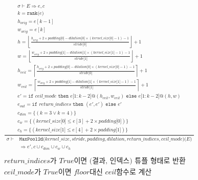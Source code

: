 \documentclass{article}
\makeatletter
\newcommand{\x}{\times}
\newcommand{\Rar}{\Rightarrow}
\newcommand{\mtt}[1]{\mathtt{#1}}
\newcommand{\op}[2]{\mtt{#1(}#2\mtt{)}}
\newcommand{\module}[3]{\mtt{#1(}#2\mtt{)(}#3\mtt{)}}
\newcommand{\conc}{\mtt{@}}
\newcommand{\ind}[1]{\mtt{[}#1\mtt{]}}
\newcommand{\indr}[2]{\mtt{[}#1\mtt{:}#2\mtt{]}}
\newcommand{\ifs}[3]{\mtt{if}\,\,#1\,\,\mtt{then}\,\,#2\,\,\mtt{else}\,\,#3}
\makeatother
\begin{document}
\begin{align*}
  \frac
  {
    \begin{array}{l}
      \sigma \vdash E \Rar e, c \\
      k = \op{rank}{e} \\
      h_{orig} = e[k-1] \\
      w_{orig} = e[k] \\
      h = \left\lfloor \frac{h_{orig} + 2 \x padding \ind{0} - dilation \ind{0}
        \x (kernel\_size \ind{0} - 1) - 1}{stride \ind{0}} \right\rfloor + 1 \\
      w = \left\lfloor \frac{w_{orig} + 2 \x padding \ind{1} - dilation \ind{1}
        \x (kernel\_size \ind{1} - 1) - 1}{stride \ind{1}} \right\rfloor + 1 \\
      h_{ceil} = \left\lceil \frac{h_{orig} + 2 \x padding \ind{0} - dilation \ind{0}
        \x (kernel\_size \ind{0} - 1) - 1}{stride \ind{0}} \right\rceil + 1 \\
      w_{ceil} = \left\lceil \frac{w_{orig} + 2 \x padding \ind{1} - dilation \ind{1}
        \x (kernel\_size \ind{1} - 1) - 1}{stride \ind{1}} \right\rceil + 1 \\
      e' = \ifs{ceil\_mode}{e\indr{1}{k-2} \conc (h_{ceil},
      w_{ceil})}{e\indr{1}{k-2} \conc (h, w)} \\
      e_{out} = \ifs{return\_indices}{(e', e')}{e'}\\
      c_{dim} = \{ (k = 3 \lor k = 4) \} \\
      c_w = \{ (kernel\_size\ind{0} \leq e[3] + 2 \x padding \ind{0}) \} \\
      c_h = \{ (kernel\_size\ind{1} \leq e[4] + 2 \x padding \ind{1}) \} 
    \end{array}
  }
  {
    \begin{array}{rl}
      \sigma \vdash & \module{MaxPool2d}{kernel\_size, stride, padding,
        dilation, return\_indices, ceil\_mode}{E} \\
      & \Rar e', c \cup c_{dim} \cup c_w \cup c_h 
    \end{array}
  } \\
  \\
  \text{$return\_indices$가 $True$이면 (결과, 인덱스) 튜플 형태로 반환}\\
  \text{$ceil\_mode$가 $True$이면 $floor$대신 $ceil$함수로 계산}
\end{align*}%
\end{document}
